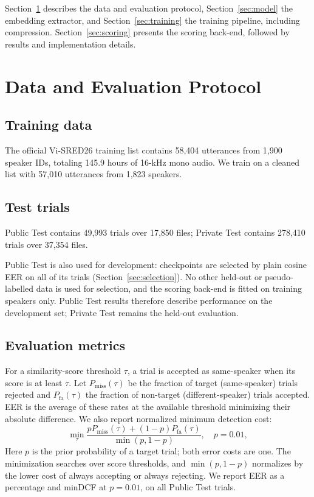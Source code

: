 \documentclass[11pt]{article}
\begin{document}
Section~\ref{sec:data} describes the data and evaluation protocol, Section~\ref{sec:model} the embedding extractor, and Section~\ref{sec:training} the training pipeline, including compression. Section~\ref{sec:scoring} presents the scoring back-end, followed by results and implementation details.

\section{Data and Evaluation Protocol}
\label{sec:data}
\subsection{Training data}
The official Vi-SRED26 training list contains 58,404 utterances from 1,900 speaker IDs, totaling 145.9 hours of 16-kHz mono audio. We train on a cleaned list with 57,010 utterances from 1,823 speakers.

\subsection{Test trials}
Public Test contains 49,993 trials over 17,850 files; Private Test contains 278,410 trials over 37,354 files.

Public Test is also used for development: checkpoints are selected by plain cosine EER on all of its trials (Section~\ref{sec:selection}). No other held-out or pseudo-labelled data is used for selection, and the scoring back-end is fitted on training speakers only. Public Test results therefore describe performance on the development set; Private Test remains the held-out evaluation.

\subsection{Evaluation metrics}
For a similarity-score threshold $\tau$, a trial is accepted as same-speaker when its score is at least $\tau$. Let $P_{\mathrm{miss}}(\tau)$ be the fraction of target (same-speaker) trials rejected and $P_{\mathrm{fa}}(\tau)$ the fraction of non-target (different-speaker) trials accepted. EER is the average of these rates at the available threshold minimizing their absolute difference. We also report normalized minimum detection cost:
\begin{equation}
 \min_\tau\frac{pP_{\mathrm{miss}}(\tau)+(1-p)P_{\mathrm{fa}}(\tau)}{\min(p,1-p)},\quad p=0.01,
\end{equation}
Here $p$ is the prior probability of a target trial; both error costs are one. The minimization searches over score thresholds, and $\min(p,1-p)$ normalizes by the lower cost of always accepting or always rejecting. We report EER as a percentage and minDCF at $p=0.01$, on all Public Test trials.
\end{document}
